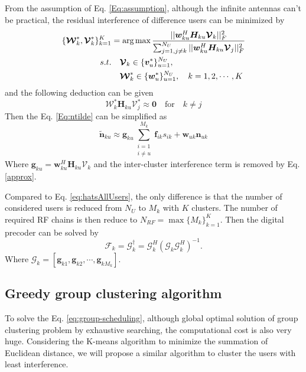 \documentclass[conference]{IEEEtran}
\def\argmax{\mathop{\mbox{arg\,max}}}
\begin{document}
From the assumption of Eq. \eqref{Eq:assumption},  although the infinite antennas can't be practical, the residual interference of difference users can be minimized by
\begin{align}\label{eq:group-scheduling}
\{\bm{\mathcal{W}}^*_k, \bm{\mathcal{V}}^*_k\}_{k=1}^{K} &= \argmax \frac{||\bm{w}^H_{ku} \bm{H}_{ku} \bm{\mathcal{V}}_k||_F^2}{\sum_{j=1,j\neq k}^{N_U}||\bm{w}^H_{ku} \bm{H}_{ku} \bm{\mathcal{V}}_j||_F^2}  \\ \nonumber
s.t. &\quad \bm{\mathcal{V}}_{k} \in  \{\bm{v}_u^*\}_{u=1}^{N_U}, \\
&\quad \bm{\mathcal{W}}^*_k \in \{\bm{w}^*_u\}_{u=1}^{N_U},\quad k = 1,2,\cdots,K
\end{align}
and the following deduction can be given
\begin{equation}\label{approx}
\bm{\mathcal{W}}^*_{k}\bm{H}_{ku}\bm{\mathcal{V}}^*_{j} \approx \bm{0} \quad \text{for} \quad k \neq j
\end{equation}
Then the Eq. \eqref{Eq:ntilde} can be simplified as 
\begin{equation}
\tilde{\bm{n}}_{ku} \approx	\bm{g}_{ku}\sum_{\substack{i=1\\i\neq u}}^{M_k}\bm{f}_{ik}s_{ik}+\bm{w}_{uk}\bm{n}_{uk}
\end{equation}
Where $\bm{g}_{ku} = \bm{w}^H_{ku}\bm{H}_{ku}\bm{\mathcal{V}}_k$ and the inter-cluster interference term is removed by Eq. \eqref{approx}. 

Compared to Eq. \eqref{eq:hatsAllUsers}, the only difference is that the number of considered users is reduced from $N_U$ to $M_k$ with $K$ clusters. The number of required RF chains is then reduce to $N_{RF} = \max \{M_k\}_{k=1}^K$. Then the digital precoder can be solved by
\begin{equation}
	\bm{\mathcal{F}}_k = \bm{\mathcal{G}}_k^\dagger = \bm{\mathcal{G}}_k^H(\bm{\mathcal{G}}_k \bm{\mathcal{G}}_k^H)^{-1}.
\end{equation}
Where $\bm{\mathcal{G}}_k = [\bm{g}_{k1}, \bm{g}_{k2},\cdots,\bm{g}_{kM_k}]$.
	
\subsection{Greedy group clustering algorithm}
To solve the Eq. \eqref{eq:group-scheduling}, although global optimal solution of group clustering problem by exhaustive searching, the computational cost is also very huge. Considering the K-means algorithm to minimize the summation of Euclidean distance, we will propose a similar algorithm to cluster the users with least interference.
\end{document}
